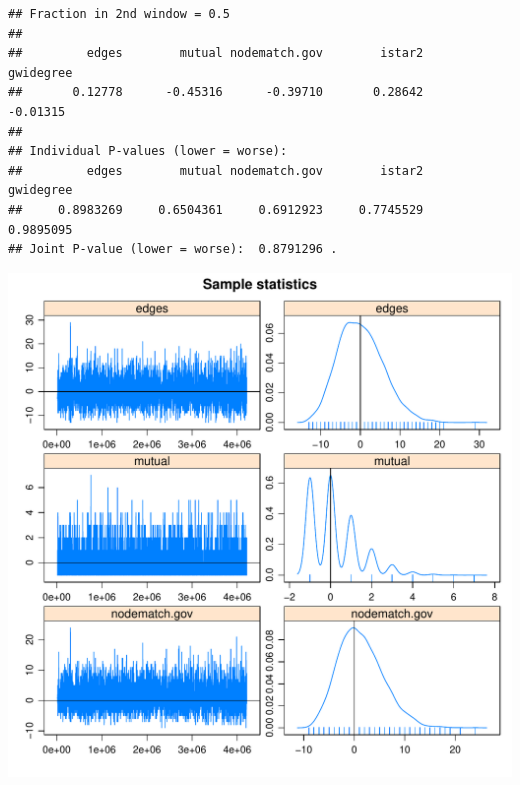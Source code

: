 \documentclass[12pt, letterpaper, notitlepage, onecolumn, twoside, openbib]{article}\usepackage[]{graphicx}\usepackage[]{color}
\makeatletter
\def\maxwidth{ %
  \ifdim\Gin@nat@width>\linewidth
    \linewidth
  \else
    \Gin@nat@width
  \fi
}
\newenvironment{kframe}{%
 \def\at@end@of@kframe{}%
 \ifinner\ifhmode%
  \def\at@end@of@kframe{\end{minipage}}%
  \begin{minipage}{\columnwidth}%
 \fi\fi%
 \def\FrameCommand##1{\hskip\@totalleftmargin \hskip-\fboxsep
 \colorbox{shadecolor}{##1}\hskip-\fboxsep
     \hskip-\linewidth \hskip-\@totalleftmargin \hskip\columnwidth}%
 \MakeFramed {\advance\hsize-\width
   \@totalleftmargin\z@ \linewidth\hsize
   \@setminipage}}%
 {\par\unskip\endMakeFramed%
 \at@end@of@kframe}
\newenvironment{knitrout}{}{} %
\makeatother
\begin{document}
\begin{knitrout}
\begin{kframe}
\begin{verbatim}
## Fraction in 2nd window = 0.5 
## 
##         edges        mutual nodematch.gov        istar2     gwidegree 
##       0.12778      -0.45316      -0.39710       0.28642      -0.01315 
## 
## Individual P-values (lower = worse):
##         edges        mutual nodematch.gov        istar2     gwidegree 
##     0.8983269     0.6504361     0.6912923     0.7745529     0.9895095 
## Joint P-value (lower = worse):  0.8791296 .
\end{verbatim}
\end{kframe}
\includegraphics[width=\maxwidth]{figure/unnamed-chunk-9-1} 


\end{knitrout}
\end{document}
